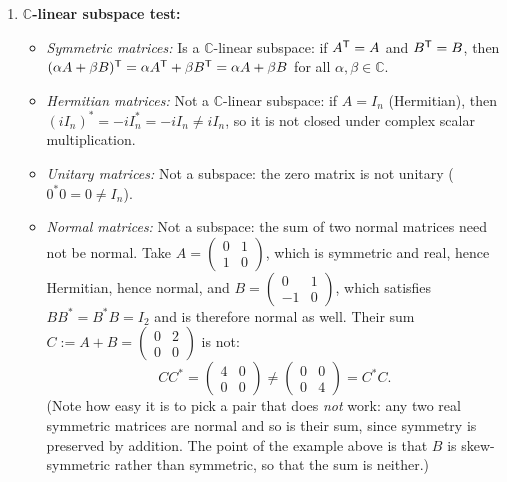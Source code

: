 \begin{exercisesolution*}
\begin{enumerate}[label=\textbf{(\alph*)}]
    \item \textbf{$\mathbb{C}$-linear subspace test:}
    \begin{itemize}
        \item \emph{Symmetric matrices:} Is a $\mathbb{C}$-linear subspace: if $A^{\mathsf{T}} = A$ and $B^{\mathsf{T}} = B$, then $(\alpha A + \beta B)^{\mathsf{T}} = \alpha A^{\mathsf{T}} + \beta B^{\mathsf{T}} = \alpha A + \beta B$ for all $\alpha, \beta \in \mathbb{C}$.
        \item \emph{Hermitian matrices:} Not a $\mathbb{C}$-linear subspace: if $A = I_n$ (Hermitian), then $(i I_n)^* = -i I_n^* = -i I_n \ne i I_n$, so it is not closed under complex scalar multiplication.
        \item \emph{Unitary matrices:} Not a subspace: the zero matrix is not unitary ($0^* 0 = 0 \ne I_n$).
        \item \emph{Normal matrices:} Not a subspace: the sum of two normal matrices need not be normal. Take $A = \left(\begin{smallmatrix} 0 & 1 \\ 1 & 0 \end{smallmatrix}\right)$, which is symmetric and real, hence Hermitian, hence normal, and $B = \left(\begin{smallmatrix} 0 & 1 \\ -1 & 0 \end{smallmatrix}\right)$, which satisfies $B B^* = B^* B = I_2$ and is therefore normal as well. Their sum $C := A + B = \left(\begin{smallmatrix} 0 & 2 \\ 0 & 0 \end{smallmatrix}\right)$ is not:
        \[
        C C^* = \begin{pmatrix} 4 & 0 \\ 0 & 0 \end{pmatrix} \ne \begin{pmatrix} 0 & 0 \\ 0 & 4 \end{pmatrix} = C^* C.
        \]
        (Note how easy it is to pick a pair that does \emph{not} work: any two real symmetric matrices are normal and so is their sum, since symmetry is preserved by addition. The point of the example above is that $B$ is skew-symmetric rather than symmetric, so that the sum is neither.)
    \end{itemize}


\end{enumerate}
\end{exercisesolution*}
